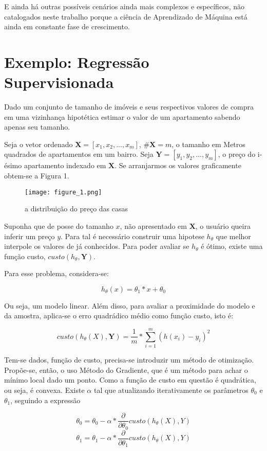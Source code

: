 E ainda há outras possíveis cenários ainda mais complexos e específicos, não catalogados neste trabalho porque a ciência de Aprendizado de Máquina está ainda em constante fase de crescimento.

\section{Exemplo: Regressão Supervisionada}

Dado um conjunto de tamanho de imóveis e seus respectivos valores de compra em uma vizinhança hipotética estimar o valor de um apartamento sabendo apenas seu tamanho.

Seja o vetor ordenado \(\mathbf{X} = [x_{1},x_{2},...,x_{m}]\), \(\#\mathbf{X} = m\), o tamanho em Metros quadrados de apartamentos em um bairro. Seja \(\mathbf{Y} = [y_{1},y_{2},...,y_{m}]\), o preço do i-ésimo apartamento indexado em \(\mathbf{X}\). Se arranjarmos os valores graficamente obtem-se a Figura 1.

\begin{figure}
	\centering
		\texttt{[image: figure\_1.png]}
		\caption{a distribuição do preço das casas}
		\label{casas}
\end{figure}

Suponha que de posse do tamanho \(x\), não apresentado em \(\mathbf{X}\), o usuário queira inferir um preço \(y\). Para tal é necessário construir uma hipotese \(h_{\theta}\) que melhor interpole os valores de já conhecidos. Para poder avaliar se \(h_{\theta}\) é ótimo, existe uma função custo, \(custo(h_{\theta},\mathbf{Y})\).

Para esse problema, considera-se:

\[h_{\theta}(x) = \theta_{1}*x + \theta_{0}\]

Ou seja, um modelo linear. Além disso, para avaliar a proximidade do modelo e da amostra, aplica-se o erro quadrádico médio como função custo, isto é:

\[custo(h_{\theta}(X),\mathbf{Y}) = \frac{1}{m}*\sum_{i=1}^{m}(h(x_{i})-y_{i})^2\]

Tem-se dados, função de custo, precisa-se introduzir um método de otimização. Propõe-se, então, o uso Método do Gradiente, que é um método para achar o mínimo local dado um ponto. Como a função de custo em questão é quadrática, ou seja, é convexa. Existe \(\alpha\) tal que atualizando iterativamente os parâmetros \(\theta_{0}\) e \(\theta_{1}\), seguindo a expressão

\[\theta_{0} = \theta_{0} - \alpha * \frac{\partial}{\partial \theta_{0}}  custo(h_{\theta}(X),Y)\]
\[\theta_{1} = \theta_{1} - \alpha * \frac{\partial}{\partial \theta_{1}}  custo(h_{\theta}(X),Y)\]

